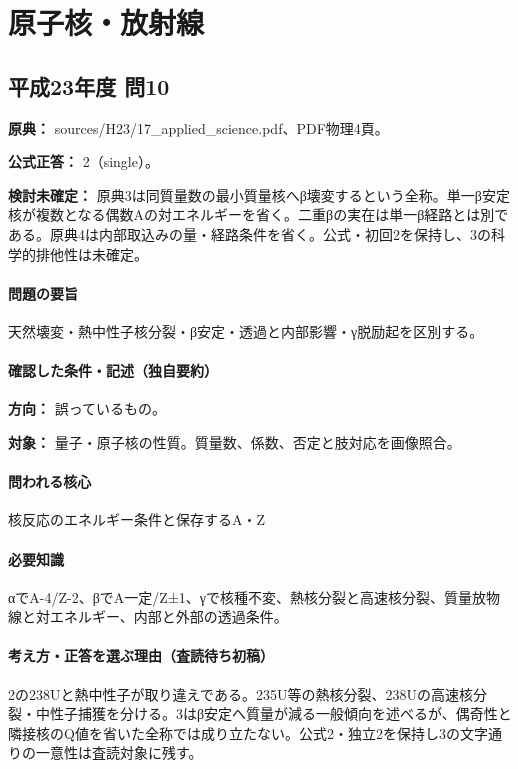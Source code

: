 \section{原子核・放射線}

\subsection{平成23年度 問10}
\label{q:h23-reg-applied-10}

\noindent\textbf{原典：} sources/H23/17\_applied\_science.pdf、PDF物理4頁。

\textbf{公式正答：} 2（single）。

\par\textbf{検討未確定：} 原典3は同質量数の最小質量核へβ壊変するという全称。単一β安定核が複数となる偶数Aの対エネルギーを省く。二重βの実在は単一β経路とは別である。原典4は内部取込みの量・経路条件を省く。公式・初回2を保持し、3の科学的排他性は未確定。

\paragraph{問題の要旨} 天然壊変・熱中性子核分裂・β安定・透過と内部影響・γ脱励起を区別する。

\paragraph{確認した条件・記述（独自要約）}\mbox{}\par

\noindent\textbf{方向：} 誤っているもの。\par

\noindent\textbf{対象：} 量子・原子核の性質。質量数、係数、否定と肢対応を画像照合。\par

\paragraph{問われる核心} 核反応のエネルギー条件と保存するA・Z

\paragraph{必要知識} αでA-4/Z-2、βでA一定/Z±1、γで核種不変、熱核分裂と高速核分裂、質量放物線と対エネルギー、内部と外部の透過条件。

\paragraph{考え方・正答を選ぶ理由（査読待ち初稿）} 2の238Uと熱中性子が取り違えである。235U等の熱核分裂、238Uの高速核分裂・中性子捕獲を分ける。3はβ安定へ質量が減る一般傾向を述べるが、偶奇性と隣接核のQ値を省いた全称では成り立たない。公式2・独立2を保持し3の文字通りの一意性は査読対象に残す。

